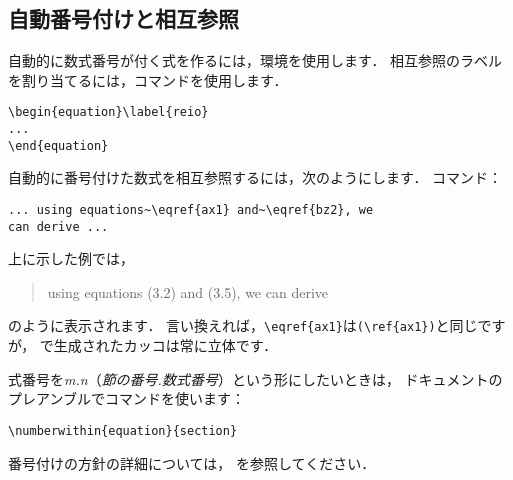 \newpage

\subsection{自動番号付けと相互参照}

自動的に数式番号が付く式を作るには，環境を使用します．
相互参照のラベルを割り当てるには，コマンドを使用します．
\begin{verbatim}
\begin{equation}\label{reio}
...
\end{equation}
\end{verbatim}
自動的に番号付けた数式を相互参照するには，次のようにします．
 コマンド：
\begin{verbatim}
... using equations~\eqref{ax1} and~\eqref{bz2}, we
can derive ...
\end{verbatim}
上に示した例では，
\begin{quote}
  using equations (3.2) and (3.5), we can derive
\end{quote}
のように表示されます．
言い換えれば，\verb'\eqref{ax1}'は\verb'(\ref{ax1})'と同じですが，
で生成されたカッコは常に立体です．

式番号を\textit{m.n}（\textit{節の番号.数式番号}）という形にしたいときは，
ドキュメントのプレアンブルでコマンドを使います：
\begin{verbatim}
\numberwithin{equation}{section}
\end{verbatim}
番号付けの方針の詳細については，
\cite[\S 6.3,\S C.8.4]{lamport}
を参照してください．

